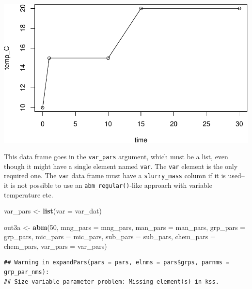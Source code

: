 \documentclass[
]{article}
\newenvironment{Shaded}{\begin{snugshade}}{\end{snugshade}}
\newcommand{\AttributeTok}[1]{\textcolor[rgb]{0.13,0.29,0.53}{#1}}
\newcommand{\DecValTok}[1]{\textcolor[rgb]{0.00,0.00,0.81}{#1}}
\newcommand{\FunctionTok}[1]{\textcolor[rgb]{0.13,0.29,0.53}{\textbf{#1}}}
\newcommand{\NormalTok}[1]{#1}
\newcommand{\OtherTok}[1]{\textcolor[rgb]{0.56,0.35,0.01}{#1}}
\begin{document}
\includegraphics{simple_demo_files/figure-latex/unnamed-chunk-14-2.pdf}

This data frame goes in the \texttt{var\_pars} argument, which must be a
list, even though it might have a single element named \texttt{var}. The
\texttt{var} element is the only required one. The \texttt{var} data
frame must have a \texttt{slurry\_mass} column if it is used--it is not
possible to use an \texttt{abm\_regular()}-like approach with variable
temperature etc.

\begin{Shaded}
\begin{Highlighting}[]
\NormalTok{var\_pars }\OtherTok{\textless{}{-}} \FunctionTok{list}\NormalTok{(}\AttributeTok{var =}\NormalTok{ var\_dat)}
\end{Highlighting}
\end{Shaded}

\begin{Shaded}
\begin{Highlighting}[]
\NormalTok{out3a }\OtherTok{\textless{}{-}} \FunctionTok{abm}\NormalTok{(}\DecValTok{50}\NormalTok{,}
             \AttributeTok{mng\_pars =}\NormalTok{ mng\_pars,}
             \AttributeTok{man\_pars =}\NormalTok{ man\_pars,}
             \AttributeTok{grp\_pars =}\NormalTok{ grp\_pars,}
             \AttributeTok{mic\_pars =}\NormalTok{ mic\_pars,}
             \AttributeTok{sub\_pars =}\NormalTok{ sub\_pars,}
             \AttributeTok{chem\_pars =}\NormalTok{ chem\_pars,}
             \AttributeTok{var\_pars =}\NormalTok{ var\_pars)}
\end{Highlighting}
\end{Shaded}

\begin{verbatim}
## Warning in expandPars(pars = pars, elnms = pars$grps, parnms = grp_par_nms):
## Size-variable parameter problem: Missing element(s) in kss.
\end{verbatim}
\end{document}
